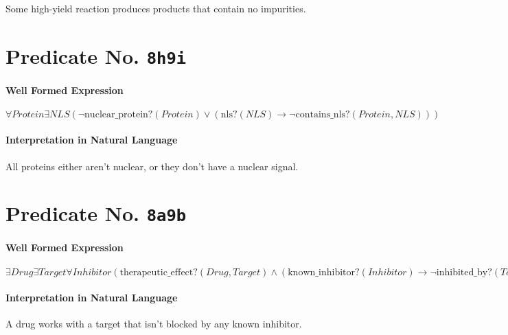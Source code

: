 \documentclass[11pt]{article}
\begin{document}
Some high-yield reaction produces products that contain no impurities.



\section{Predicate No. \texttt{8h9i}}
\label{sec:org8612a94}

\paragraph*{Well Formed Expression}
\label{sec:org7ab3e7a}

\(\forall \mathit{Protein} \exists \mathit{NLS} (\neg \mathrm{nuclear\_protein?}(\mathit{Protein}) \lor (\mathrm{nls?}(\mathit{NLS}) \rightarrow \neg \mathrm{contains\_nls?}(\mathit{Protein}, \mathit{NLS})))\)

\paragraph*{Interpretation in Natural Language}
\label{sec:orgfd047ed}

All proteins either aren't nuclear, or they don't have a nuclear signal.



\section{Predicate No. \texttt{8a9b}}
\label{sec:org386d507}

\paragraph*{Well Formed Expression}
\label{sec:org20a7bfb}

\(\exists \mathit{Drug} \exists \mathit{Target} \forall \mathit{Inhibitor} (\mathrm{therapeutic\_effect?}(\mathit{Drug}, \mathit{Target}) \land (\mathrm{known\_inhibitor?}(\mathit{Inhibitor}) \rightarrow \neg \mathrm{inhibited\_by?}(\mathit{Target}, \mathit{Inhibitor})))\)

\paragraph*{Interpretation in Natural Language}
\label{sec:org680a577}

A drug works with a target that isn't blocked by any known inhibitor.
\end{document}
